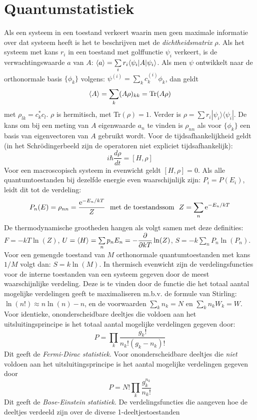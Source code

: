 \section[~~Quantumstatistiek]{Quantumstatistiek}
Als een systeem in een toestand verkeert waarin men geen maximale informatie
over dat systeem heeft is het te beschrijven met de {\it dichtheidsmatrix}
$\rho$. Als het systeem met kans $r_i$ in een toestand met golffunctie
$\psi_i$ verkeert, is de verwachtingswaarde $a$ van $A$:
$\left\langle a \right\rangle=\sum\limits_ir_i\langle\psi_i|A|\psi_i\rangle$.
\npar
Als men $\psi$ ontwikkelt naar de orthonormale basis $\{\phi_k\}$ volgens:
$\psi^{(i)}=\sum\limits_k c_k^{(i)}\phi_k$, dan geldt
\[
\left\langle A \right\rangle=\sum_k(A\rho)_{kk}={\rm Tr}(A\rho)
\]
met $\rho_{lk}=c_k^*c_l$. $\rho$ is hermitisch, met Tr$(\rho)=1$. Verder is
$\rho=\sum r_i|\psi_i\rangle\langle\psi_i|$. De kans om bij een meting van
$A$ eigenwaarde $a_n$ te vinden is $\rho_{nn}$ als voor $\{\phi_k\}$ een
basis van eigenvectoren van $A$ gebruikt wordt. Voor de tijdsafhankelijkheid
geldt (in het Schr\"odingerbeeld zijn de operatoren niet expliciet
tijdsafhankelijk):
\[
i\hbar\frac{d\rho}{dt}=[H,\rho]
\]
Voor een macroscopisch systeem in evenwicht geldt $[H,\rho]=0$. Als alle
quantumtoestanden bij dezelfde energie even waarschijnlijk zijn:
$P_i=P(E_i)$, leidt dit tot de verdeling:
\[
P_n(E)=\rho_{nn}=\frac{{\rm e}^{-E_n/kT}}{Z}~~\mbox{met de toestandssom}~~
Z=\sum_n{\rm e}^{-E_n/kT}
\]
De thermodynamische grootheden hangen als volgt samen met deze definities:
$F=-kT\ln(Z)$, $U=\left\langle H \right\rangle=\sum\limits_np_nE_n=\displaystyle-\frac{\partial }{\partial kT}\ln(Z)$,
$S=-k\sum\limits_nP_n\ln(P_n)$. Voor een gemengde toestand van $M$
orthonormale quantumtoestanden met kans $1/M$ volgt dan: $S=k\ln(M)$.
\npar
In thermisch evenwicht zijn de verdelingsfuncties voor de interne toestanden
van een systeem gegeven door de meest waarschijnlijke verdeling. Deze is te
vinden door de functie die het totaal aantal mogelijke verdelingen geeft te
maximaliseren m.b.v. de formule van Stirling: $\ln(n!)\approx n\ln(n)-n$,
en de voorwaarden $\sum\limits_kn_k=N$ en $\sum\limits_kn_kW_k=W$.
Voor identieke, ononderscheidbare deeltjes die voldoen aan het
uitsluitingsprincipe is het totaal aantal mogelijke verdelingen gegeven door:
\[
P=\prod_k\frac{g_k!}{n_k!(g_k-n_k)!}
\]
Dit geeft de {\it Fermi-Dirac statistiek}. Voor ononderscheidbare deeltjes
die {\it niet} voldoen aan het uitsluitingsprincipe is het aantal mogelijke
verdelingen gegeven door
\[
P=N!\prod_k\frac{g_k^{n_k}}{n_k!}
\]
Dit geeft de {\it Bose-Einstein statistiek}. De verdelingsfuncties die
aangeven hoe de deeltjes verdeeld zijn over de diverse 1-deeltjestoestanden
